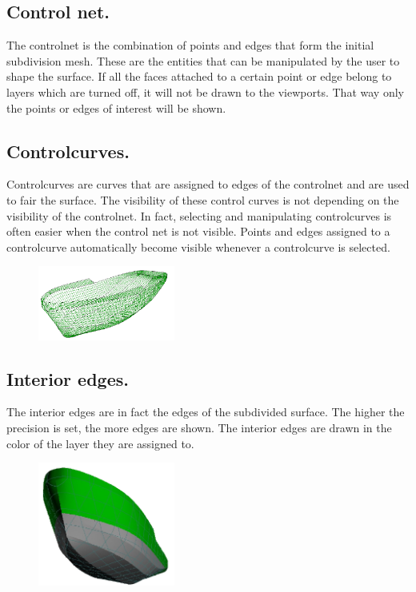 \documentclass[12pt]{article}
\begin{document}
\subsection{Control net.} \label{control-net}
The controlnet is the combination of points and edges that form the
initial subdivision mesh.  These are the entities that can be
manipulated by the user to shape the surface. If all the faces
attached to a certain point or edge belong to layers which are turned
off, it will not be drawn to the viewports. That way only the points
or edges of interest will be shown.

\subsection{Controlcurves.}
Controlcurves are curves that are assigned to edges of the controlnet
and are used to fair the surface. The visibility of these control
curves is not depending on the visibility of the controlnet.  In fact,
selecting and manipulating controlcurves is often easier when the
control net is not visible. Points and edges assigned to a
controlcurve automatically become visible whenever a controlcurve is
selected.

\begin{figure}
        \centering
        \includegraphics[width=0.4\textwidth,natwidth=559,natheight=299]{interioredges.png}
        \caption{}
        \label{fig:interioredges}
\end{figure}

\subsection{Interior edges.} \label{interior-edges}
The interior edges are in fact the edges of the subdivided
surface. The higher the precision is set, the more edges are
shown. The interior edges are drawn in the color of the layer they are
assigned to.

\begin{figure}
        \centering
        \includegraphics[width=0.4\textwidth,natwidth=350,natheight=317]{showbothsides.png}
        \caption{}
        \label{fig:showbothsides}
\end{figure}
\end{document}
